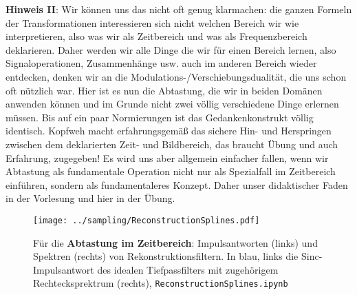 \textbf{Hinweis II}: Wir können uns das nicht oft genug klarmachen: die ganzen
Formeln der Transformationen interessieren sich nicht welchen Bereich wir wie
interpretieren,
also was wir als Zeitbereich und was als Frequenzbereich deklarieren. Daher werden
wir alle Dinge die wir für einen Bereich lernen, also Signaloperationen, Zusammenhänge usw.
auch im anderen Bereich wieder entdecken, denken wir an die Modulations-/Verschiebungsdualität,
die uns schon oft nützlich war.
Hier ist es nun die Abtastung, die wir in beiden Domänen anwenden können und
im Grunde nicht zwei völlig verschiedene Dinge erlernen müssen. Bis auf ein
paar Normierungen ist das Gedankenkonstrukt völlig identisch. Kopfweh macht
erfahrungsgemäß das sichere Hin- und Herspringen zwischen dem deklarierten
Zeit- und Bildbereich,
das braucht Übung und auch Erfahrung, zugegeben! Es wird uns aber allgemein
einfacher fallen, wenn wir Abtastung als fundamentale Operation
nicht nur als Spezialfall im Zeitbereich einführen, sondern als fundamentaleres
Konzept. Daher unser didaktischer Faden in der Vorlesung und hier in der
Übung.



\begin{figure}
\texttt{[image: ../sampling/ReconstructionSplines.pdf]}
  \caption{Für die \textbf{Abtastung im Zeitbereich}: Impulsantworten (links) und
  Spektren (rechts) von
  Rekonstruktionsfiltern. In blau, links die Sinc-Impulsantwort des idealen
  Tiefpassfilters mit zugehörigem Rechtecksprektrum (rechts),
  \texttt{ReconstructionSplines.ipynb}}
  \label{fig:ReconstructionSplines}
\end{figure}



\clearpage

